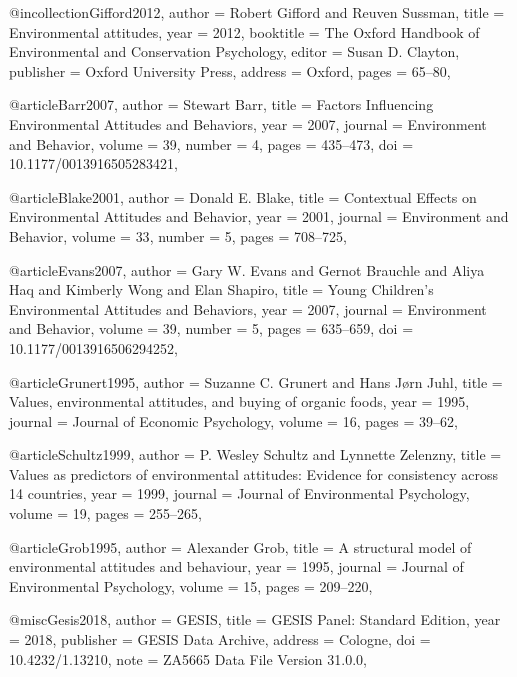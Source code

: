 @incollection{Gifford2012,
  author = {Robert Gifford and Reuven Sussman},
  title = {Environmental attitudes},
  year = {2012},
  booktitle = {The Oxford Handbook of Environmental and Conservation Psychology},
  editor = {Susan D. Clayton},
  publisher = {Oxford University Press},
  address = {Oxford},
  pages = {65--80},
}

@article{Barr2007, 
  author = {Stewart Barr},
  title = {Factors Influencing Environmental Attitudes and Behaviors},
  year = {2007},
  journal = {Environment and Behavior},
  volume = {39},
  number = {4},
  pages = {435--473},
  doi = {10.1177/0013916505283421},
}

@article{Blake2001,
  author = {Donald E. Blake},
  title = {Contextual Effects on Environmental Attitudes and Behavior},
  year = {2001},
  journal = {Environment and Behavior},
  volume = {33},
  number = {5},
  pages = {708--725},
}

@article{Evans2007,
  author = {Gary W. Evans and Gernot Brauchle and Aliya Haq and Kimberly Wong and Elan Shapiro},
  title = {Young Children's Environmental Attitudes and Behaviors},
  year = {2007},
  journal = {Environment and Behavior},
  volume = {39},
  number = {5},
  pages = {635--659},
  doi = {10.1177/0013916506294252},
}

@article{Grunert1995,
  author = {Suzanne C. Grunert and Hans J{\o}rn Juhl},
  title = {Values, environmental attitudes, and buying of organic foods},
  year = {1995},
  journal = {Journal of Economic Psychology},
  volume = {16},
  pages = {39--62},
}

@article{Schultz1999, 
  author = {P. Wesley Schultz and Lynnette Zelenzny},
  title = {Values as predictors of environmental attitudes: Evidence for consistency across 14 countries},
  year = {1999},
  journal = {Journal of Environmental Psychology},
  volume = {19},
  pages = {255--265},
}

@article{Grob1995,
  author = {Alexander Grob},
  title = {A structural model of environmental attitudes and behaviour},
  year = {1995},
  journal = {Journal of Environmental Psychology},
  volume = {15},
  pages = {209--220},
}

@misc{Gesis2018,
  author = {GESIS},
  title = {GESIS Panel: Standard Edition},
  year = {2018},
  publisher = {GESIS Data Archive},
  address = {Cologne},
  doi = {10.4232/1.13210},
  note = {ZA5665 Data File Version 31.0.0},
}
  
  